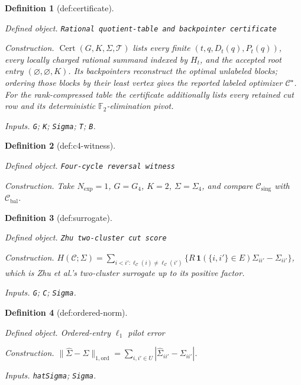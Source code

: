 \documentclass{article}
\newtheorem{definition}{Definition}
\begin{document}
\begin{definition}[def:certificate]\label{def:certificate}
\par\smallskip\noindent\emph{Defined object.} \texttt{Rational quotient-\allowbreak{}table and backpointer certificate}
\par\smallskip\noindent\emph{Construction.} \(\operatorname{Cert}(G,K,\Sigma,\mathcal T)\) lists every finite \((t,q,D_t(q),P_t(q))\), every locally charged rational summand indexed by \(H_t\), and the accepted root entry \((\varnothing,\varnothing,K)\).  Its backpointers reconstruct the optimal unlabeled blocks; ordering those blocks by their least vertex gives the reported labeled optimizer \(\mathcal C^\star\).  For the rank-compressed table the certificate additionally lists every retained cut row and its deterministic \(\mathbb F_2\)-elimination pivot.
\par\smallskip\noindent\emph{Inputs.} \texttt{G}; \texttt{K}; \texttt{Sigma}; \texttt{T}; \texttt{B}.
\end{definition}

\begin{definition}[def:c4-witness]\label{def:c4-witness}
\par\smallskip\noindent\emph{Defined object.} \texttt{Four-\allowbreak{}cycle reversal witness}
\par\smallskip\noindent\emph{Construction.} Take \(N_{\exp}=1\), \(G=G_4\), \(K=2\), \(\Sigma=\Sigma_4\), and compare \(\mathcal C_{\mathrm{sing}}\) with \(\mathcal C_{\mathrm{bal}}\).
\end{definition}

\begin{definition}[def:surrogate]\label{def:surrogate}
\par\smallskip\noindent\emph{Defined object.} \texttt{Zhu two-\allowbreak{}cluster cut score}
\par\smallskip\noindent\emph{Construction.} \(H(\mathcal C;\Sigma)=\sum_{i<i':\ell_{\mathcal C}(i)\ne\ell_{\mathcal C}(i')}\{R\,\mathbf1(\{i,i'\}\in E)\Sigma_{ii'}-\Sigma_{ii'}\}\), which is Zhu et al.'s two-cluster surrogate up to its positive factor.
\par\smallskip\noindent\emph{Inputs.} \texttt{G}; \texttt{C}; \texttt{Sigma}.
\end{definition}

\begin{definition}[def:ordered-norm]\label{def:ordered-norm}
\par\smallskip\noindent\emph{Defined object.} Ordered-entry \(\ell_1\) pilot error
\par\smallskip\noindent\emph{Construction.} \(\|\widehat\Sigma-\Sigma\|_{1,\mathrm{ord}}=\sum_{i,i'\in U}|\widehat\Sigma_{ii'}-\Sigma_{ii'}|\).
\par\smallskip\noindent\emph{Inputs.} \texttt{hatSigma}; \texttt{Sigma}.
\end{definition}
\end{document}

